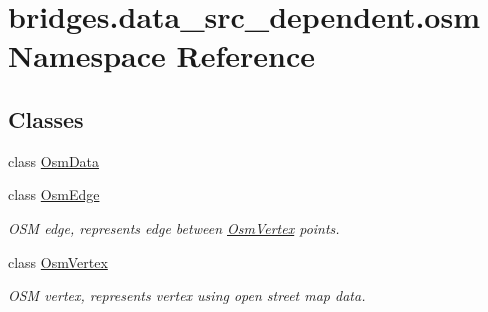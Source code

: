 \hypertarget{namespacebridges_1_1data__src__dependent_1_1osm}{}\section{bridges.\+data\+\_\+src\+\_\+dependent.\+osm Namespace Reference}
\label{namespacebridges_1_1data__src__dependent_1_1osm}
\subsection*{Classes}
\begin{DoxyCompactItemize}
\item 
class \hyperlink{classbridges_1_1data__src__dependent_1_1osm_1_1_osm_data}{Osm\+Data}
\item 
class \hyperlink{classbridges_1_1data__src__dependent_1_1osm_1_1_osm_edge}{Osm\+Edge}
\begin{DoxyCompactList}\small\item\em O\+SM edge, represents edge between \hyperlink{classbridges_1_1data__src__dependent_1_1osm_1_1_osm_vertex}{Osm\+Vertex} points. \end{DoxyCompactList}\item 
class \hyperlink{classbridges_1_1data__src__dependent_1_1osm_1_1_osm_vertex}{Osm\+Vertex}
\begin{DoxyCompactList}\small\item\em O\+SM vertex, represents vertex using open street map data. \end{DoxyCompactList}\end{DoxyCompactItemize}
